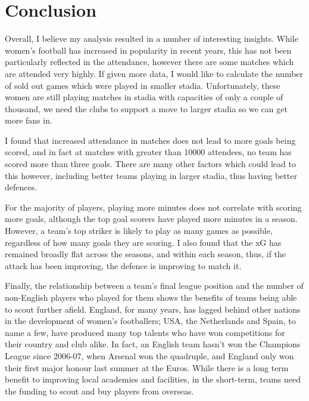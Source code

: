 \documentclass[12pt, a4paper, twocolumn]{article}
\begin{document}
\section{Conclusion}

Overall, I believe my analysis resulted in a number of interesting insights. While women's football has increased in popularity in recent years, this has not been particularly reflected in the attendance, however there are some matches which are attended very highly. If given more data, I would like to calculate the number of sold out games which were played in smaller stadia. Unfortunately, these women are still playing matches in stadia with capacities of only a couple of thousand, we need the clubs to support a move to larger stadia so we can get more fans in.

I found that increased attendance in matches does not lead to more goals being scored, and in fact at matches with greater than 10000 attendees, no team has scored more than three goals. There are many other factors which could lead to this however, including better teams playing in larger stadia, thus having better defences.

For the majority of players, playing more minutes does not correlate with scoring more goals, although the top goal scorers have played more minutes in a season. However, a team's top striker is likely to play as many games as possible, regardless of how many goals they are scoring. I also found that the xG has remained broadly flat across the seasons, and within each season, thus, if the attack has been improving, the defence is improving to match it.

Finally, the relationship between a team's final league position and the number of non-English players who played for them shows the benefits of teams being able to scout further afield. England, for many years, has lagged behind other nations in the development of women's footballers; USA, the Netherlands and Spain, to name a few, have produced many top talents who have won competitions for their country and club alike. In fact, an English team hasn't won the Champions League since 2006-07, when Arsenal won the quadruple, and England only won their first major honour last summer at the Euros. While there is a long term benefit to improving local academies and facilities, in the short-term, teams need the funding to scout and buy players from overseas.

\end{document}
